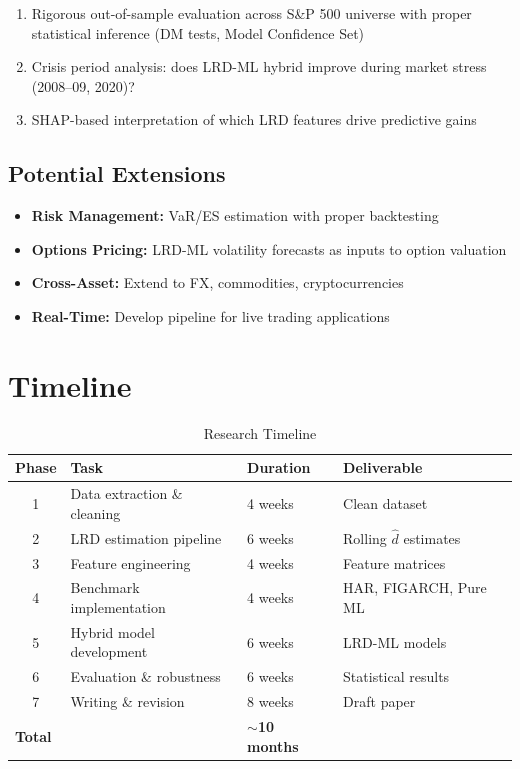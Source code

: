 \documentclass[11pt,a4paper]{article}
\theoremstyle{definition}
\newcommand{\dhat}{\hat{d}}
\begin{document}
\begin{enumerate}
    \item Rigorous out-of-sample evaluation across S\&P 500 universe with proper statistical inference (DM tests, Model Confidence Set)
    
    \item Crisis period analysis: does LRD-ML hybrid improve during market stress (2008--09, 2020)?
    
    \item SHAP-based interpretation of which LRD features drive predictive gains
\end{enumerate}

\subsection{Potential Extensions}

\begin{itemize}
    \item \textbf{Risk Management:} VaR/ES estimation with proper backtesting
    \item \textbf{Options Pricing:} LRD-ML volatility forecasts as inputs to option valuation
    \item \textbf{Cross-Asset:} Extend to FX, commodities, cryptocurrencies
    \item \textbf{Real-Time:} Develop pipeline for live trading applications
\end{itemize}

\section{Timeline}

\begin{table}[htbp]
\centering
\caption{Research Timeline}
\begin{tabular}{@{}clll@{}}
\toprule
\textbf{Phase} & \textbf{Task} & \textbf{Duration} & \textbf{Deliverable} \\
\midrule
1 & Data extraction \& cleaning & 4 weeks & Clean dataset \\
2 & LRD estimation pipeline & 6 weeks & Rolling $\dhat$ estimates \\
3 & Feature engineering & 4 weeks & Feature matrices \\
4 & Benchmark implementation & 4 weeks & HAR, FIGARCH, Pure ML \\
5 & Hybrid model development & 6 weeks & LRD-ML models \\
6 & Evaluation \& robustness & 6 weeks & Statistical results \\
7 & Writing \& revision & 8 weeks & Draft paper \\
\midrule
\multicolumn{2}{l}{\textbf{Total}} & \textbf{$\sim$10 months} & \\
\bottomrule
\end{tabular}
\end{table}
\end{document}
